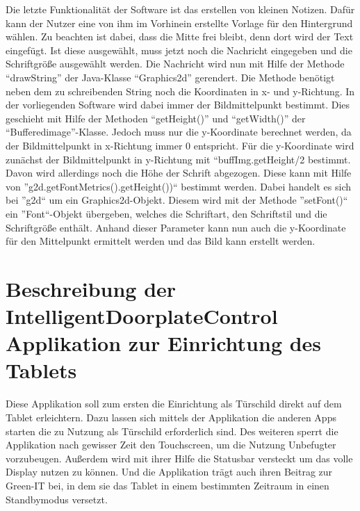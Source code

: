 \begin{flushleft}
Die letzte Funktionalität der Software ist das erstellen von kleinen Notizen. Dafür kann der Nutzer eine von ihm im Vorhinein erstellte Vorlage für den Hintergrund wählen. Zu beachten ist dabei, dass die Mitte frei bleibt, denn dort wird der Text eingefügt. Ist diese ausgewählt, muss jetzt noch die Nachricht eingegeben und die Schriftgröße ausgewählt werden. Die Nachricht wird nun mit Hilfe der Methode ``drawString'' der Java-Klasse ``Graphics2d'' gerendert. Die Methode benötigt neben dem zu schreibenden String noch die Koordinaten in x- und y-Richtung. In der vorliegenden Software wird dabei immer der Bildmittelpunkt bestimmt. Dies geschieht mit Hilfe der Methoden ``getHeight()'' und ``getWidth()'' der ``Bufferedimage''-Klasse. Jedoch muss nur die y-Koordinate berechnet werden, da der Bildmittelpunkt in x-Richtung immer 0 entspricht. Für die y-Koordinate wird zunächst der Bildmittelpunkt in y-Richtung mit ``buffImg.getHeight/2 bestimmt.
Davon wird allerdings noch die Höhe der Schrift abgezogen. Diese kann mit Hilfe von ''g2d.getFontMetrics().getHeight())`` bestimmt werden. Dabei handelt es sich bei ''g2d`` um ein Graphics2d-Objekt. Diesem wird mit der Methode ''setFont()`` ein ''Font``-Objekt übergeben, welches die Schriftart, den Schriftstil und die Schriftgröße enthält. Anhand dieser Parameter kann nun auch die y-Koordinate für den Mittelpunkt ermittelt werden und das Bild kann erstellt werden.

\section{Beschreibung der IntelligentDoorplateControl Applikation zur Einrichtung des Tablets}
Diese Applikation soll zum ersten die Einrichtung als Türschild direkt auf dem Tablet erleichtern. Dazu lassen sich mittels der Applikation die anderen Apps starten die zu Nutzung als Türschild erforderlich sind. Des weiteren sperrt die Applikation nach gewisser Zeit den Touchscreen, um die Nutzung Unbefugter vorzubeugen. Außerdem wird mit ihrer Hilfe die Statusbar versteckt um das volle Display nutzen zu können. Und die Applikation trägt auch ihren Beitrag zur Green-IT bei, in dem sie das Tablet in einem bestimmten Zeitraum in einen Standbymodus versetzt.


\end{flushleft}
